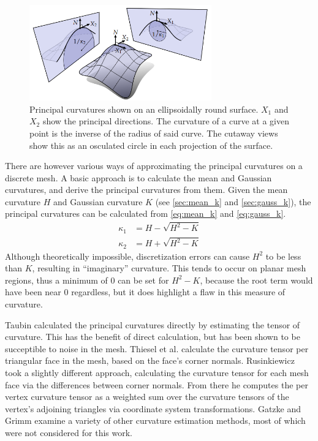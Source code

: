 \begin{figure}
	\centering
	\includegraphics[width=0.7\textwidth]{../resources/principal_curvatures.png}
	\caption{
Principal curvatures shown on an ellipsoidally round surface\cite{Digital_geom_proc_w_disc_ext_calc}.
$X_1$ and $X_2$ show the principal directions.
The curvature of a curve at a given point is the inverse of the radius of said curve.
The cutaway views show this as an osculated circle in each projection of the surface.
	}
	\label{fig:principal_k}
\end{figure}

There are however various ways of approximating the principal curvatures on a discrete mesh\cite{EstCurvOnTriMesh, DiscDiffGeoOpsTriMani}.
A basic approach is to calculate the mean and Gaussian curvatures, and derive the principal curvatures from them\cite{DDGAppIntro_19_discrete_k_2, Gauss_mean_k_notes}.
Given the mean curvature $H$ and Gaussian curvature $K$ (see \ref{sec:mean_k} and \ref{sec:gauss_k}), the principal curvatures can be calculated from \ref{eq:mean_k} and \ref{eq:gauss_k}.
\begin{align}
	\kappa_1 &= H - \sqrt{H^2 - K} \\
	\kappa_2 &= H + \sqrt{H^2 - K}
\end{align}
Although theoretically impossible, discretization errors can cause $H^2$ to be less than $K$, resulting in ``imaginary'' curvature.
This tends to occur on planar mesh regions, thus a minimum of 0 can be set for $H^2 - K$, because the root term would have been near 0 regardless, but it does highlight a flaw in this measure of curvature.

Taubin calculated the principal curvatures directly by estimating the tensor of curvature\cite{TaubinTensor}.
This has the benefit of direct calculation, but has been shown to be succeptible to noise in the mesh\cite{Comp_k_notes}.
Thiesel et al. calculate the curvature tensor per triangular face in the mesh, based on the face's corner normals\cite{Norm_based_k_tensor_est}.
Rusinkiewicz took a slightly different approach, calculating the curvature tensor for each mesh face via the differences between corner normals\cite{SRTensor}.
From there he computes the per vertex curvature tensor as a weighted sum over the curvature tensors of the vertex's adjoining triangles via coordinate system transformations.
Gatzke and Grimm examine a variety of other curvature estimation methods\cite{EstCurvOnTriMesh}, most of which were not considered for this work.

